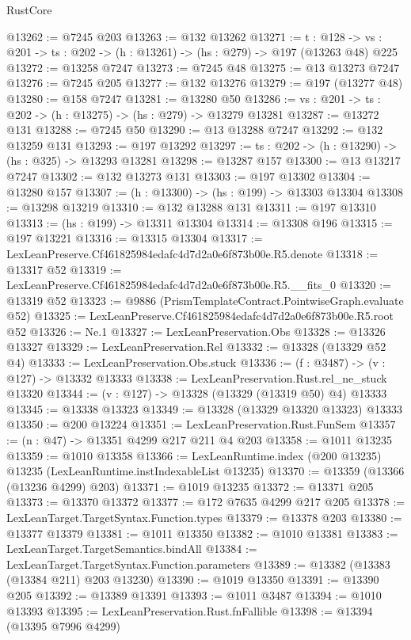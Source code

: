 \begin{lexlean}{RustCore}
\begin{coremodule}
@13262 := @7245 @203
@13263 := @132 @13262
@13271 := {t : @128} ->
  {vs : @201} -> {ts : @202} -> (h : @13261) -> (hs : @279) -> @197 (@13263 @48) @225
@13272 := @13258 @7247
@13273 := @7245 @48
@13275 := @13 @13273 @7247
@13276 := @7245 @205
@13277 := @132 @13276
@13279 := @197 (@13277 @48)
@13280 := @158 @7247
@13281 := @13280 @50
@13286 := {vs : @201} -> {ts : @202} -> (h : @13275) -> (hs : @279) -> @13279 @13281
@13287 := @13272 @131
@13288 := @7245 @50
@13290 := @13 @13288 @7247
@13292 := @132 @13259 @131
@13293 := @197 @13292
@13297 := {ts : @202} -> (h : @13290) -> (hs : @325) -> @13293 @13281
@13298 := @13287 @157
@13300 := @13 @13217 @7247
@13302 := @132 @13273 @131
@13303 := @197 @13302
@13304 := @13280 @157
@13307 := (h : @13300) -> (hs : @199) -> @13303 @13304
@13308 := @13298 @13219
@13310 := @132 @13288 @131
@13311 := @197 @13310
@13313 := (hs : @199) -> @13311 @13304
@13314 := @13308 @196
@13315 := @197 @13221
@13316 := @13315 @13304
@13317 := LexLeanPreserve.Cf461825984edafc4d7d2a0e6f873b00e.R5.denote
@13318 := @13317 @52
@13319 := LexLeanPreserve.Cf461825984edafc4d7d2a0e6f873b00e.R5.__fits_0
@13320 := @13319 @52
@13323 := @9886 (PrismTemplateContract.PointwiseGraph.evaluate @52)
@13325 := LexLeanPreserve.Cf461825984edafc4d7d2a0e6f873b00e.R5.root @52
@13326 := Ne.{1}
@13327 := LexLeanPreservation.Obs
@13328 := @13326 @13327
@13329 := LexLeanPreservation.Rel
@13332 := @13328 (@13329 @52 @4)
@13333 := LexLeanPreservation.Obs.stuck
@13336 := (f : @3487) -> (v : @127) -> @13332 @13333
@13338 := LexLeanPreservation.Rust.rel_ne_stuck @13320
@13344 := (v : @127) -> @13328 (@13329 (@13319 @50) @4) @13333
@13345 := @13338 @13323
@13349 := @13328 (@13329 @13320 @13323) @13333
@13350 := @200 @13224
@13351 := LexLeanPreservation.Rust.FunSem
@13357 := (n : @47) -> @13351 @4299 @217 @211 @4 @203
@13358 := @1011 @13235
@13359 := @1010 @13358
@13366 := LexLeanRuntime.index (@200 @13235) @13235 (LexLeanRuntime.instIndexableList @13235)
@13370 := @13359 (@13366 (@13236 @4299) @203)
@13371 := @1019 @13235
@13372 := @13371 @205
@13373 := @13370 @13372
@13377 := @172 @7635 @4299 @217 @205
@13378 := LexLeanTarget.TargetSyntax.Function.types
@13379 := @13378 @203
@13380 := @13377 @13379
@13381 := @1011 @13350
@13382 := @1010 @13381
@13383 := LexLeanTarget.TargetSemantics.bindAll
@13384 := LexLeanTarget.TargetSyntax.Function.parameters
@13389 := @13382 (@13383 (@13384 @211) @203 @13230)
@13390 := @1019 @13350
@13391 := @13390 @205
@13392 := @13389 @13391
@13393 := @1011 @3487
@13394 := @1010 @13393
@13395 := LexLeanPreservation.Rust.fnFallible
@13398 := @13394 (@13395 @7996 @4299)

\end{coremodule}
\end{lexlean}

